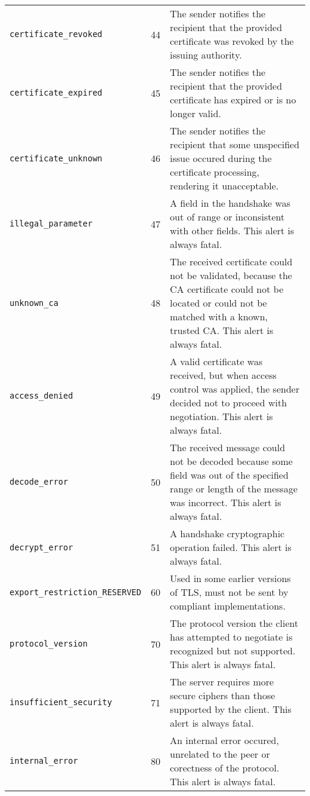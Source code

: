 \begin{tabularx}{\linewidth}{@{}l l X}
    \texttt{certificate\_revoked}         & 44  & The sender notifies the recipient that the provided certificate was revoked by the issuing authority. \\
    \texttt{certificate\_expired}         & 45  & The sender notifies the recipient that the provided certificate has expired or is no longer valid. \\
    \texttt{certificate\_unknown}         & 46  & The sender notifies the recipient that some unspecified issue occured during the certificate processing,
                                                  rendering it unacceptable. \\
    \texttt{illegal\_parameter}           & 47  & A field in the handshake was out of range or inconsistent with other fields. This alert is always fatal. \\
    \texttt{unknown\_ca}                  & 48  & The received certificate could not be validated, because the CA certificate could not be located or could
                                                  not be matched with a known, trusted CA. This alert is always fatal. \\
    \texttt{access\_denied}               & 49  & A valid certificate was received, but when access control was applied, the sender decided not to proceed
                                                  with negotiation. This alert is always fatal. \\
    \texttt{decode\_error}                & 50  & The received message could not be decoded because some field was out of the specified range or length of
                                                  the message was incorrect. This alert is always fatal. \\
    \texttt{decrypt\_error}               & 51  & A handshake cryptographic operation failed. This alert is always fatal. \\
    \texttt{export\_restriction\_RESERVED}& 60  & Used in some earlier versions of TLS, must not be sent by compliant implementations. \\
    \texttt{protocol\_version}            & 70  & The protocol version the client has attempted to negotiate is recognized but not supported.
                                                  This alert is always fatal. \\
    \texttt{insufficient\_security}       & 71  & The server requires more secure ciphers than those supported by the client. This alert is always fatal. \\
    \texttt{internal\_error}              & 80  & An internal error occured, unrelated to the peer or corectness of the protocol. This alert is always fatal. \\

\end{tabularx}
